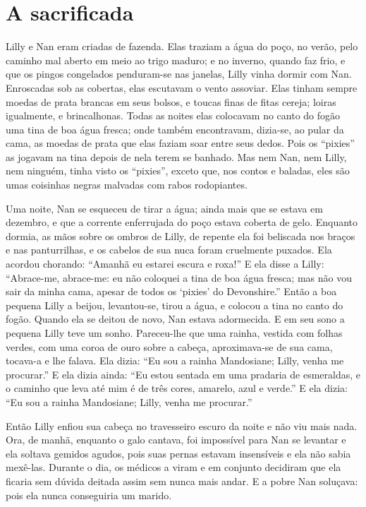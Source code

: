 \section{A sacrificada}

Lilly e Nan eram criadas de fazenda. Elas traziam a água do poço, no
verão, pelo caminho mal aberto em meio ao trigo maduro; e no inverno, quando faz
frio, e que os pingos congelados penduram-se nas janelas, Lilly vinha
dormir com Nan. Enroscadas sob as cobertas, elas escutavam o vento
assoviar. Elas tinham sempre moedas de prata brancas em seus bolsos, e toucas finas
de fitas cereja; loiras igualmente, e brincalhonas. Todas as noites elas
colocavam no canto do fogão uma tina de boa água fresca; onde também
encontravam, dizia-se, ao pular da cama, as moedas de prata que elas faziam soar
entre seus dedos. Pois os “pixies” as jogavam na tina depois de nela terem se
banhado. Mas nem Nan, nem Lilly, nem ninguém, tinha visto os “pixies”, exceto que,
nos contos e baladas, eles são umas coisinhas negras malvadas com rabos
rodopiantes.

Uma noite, Nan se esqueceu de tirar a água; ainda mais que se estava em
dezembro, e que a corrente enferrujada do poço estava coberta de gelo.
Enquanto dormia, as mãos sobre os ombros de Lilly, de repente ela foi
beliscada nos braços e nas panturrilhas, e os cabelos de sua nuca foram
cruelmente puxados. Ela acordou chorando: ``Amanhã eu estarei escura e
roxa!'' E ela disse a Lilly: “Abrace-me, abrace-me: eu não coloquei a tina
de boa água fresca; mas não vou sair da minha cama, apesar de todos os
`pixies' do Devonshire.” Então a boa pequena Lilly a beijou, levantou-se,
tirou a água, e colocou a tina no canto do fogão. Quando ela se deitou de
novo, Nan estava adormecida.
\pagebreak
E em seu sono a pequena Lilly teve um sonho. Pareceu-lhe que uma
rainha, vestida com folhas verdes, com uma coroa de ouro sobre a cabeça,
aproximava-se de sua cama, tocava-a e lhe falava. Ela dizia: “Eu sou a
rainha Mandosiane; Lilly, venha me procurar.” E ela dizia ainda: “Eu estou
sentada em uma pradaria de esmeraldas, e o caminho que leva até mim é de
três cores, amarelo, azul e verde.” E ela dizia: “Eu sou a rainha
Mandosiane; Lilly, venha me procurar.”

Então Lilly enfiou sua cabeça no travesseiro escuro da noite e não viu
mais nada. Ora, de manhã, enquanto o galo cantava, foi impossível para Nan
se levantar e ela soltava gemidos agudos, pois suas pernas estavam
insensíveis e ela não sabia mexê-las. Durante o dia, os médicos a viram e
em conjunto decidiram que ela ficaria sem dúvida deitada assim sem nunca
mais andar. E a pobre Nan soluçava: pois ela nunca conseguiria um marido.

